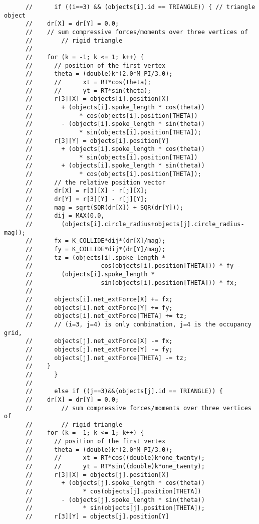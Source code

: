 \documentclass{article}
\begin{document}
\begin{verbatim}
      //      if ((i==3) && (objects[i].id == TRIANGLE)) { // triangle object
      //	dr[X] = dr[Y] = 0.0;
      //	// sum compressive forces/moments over three vertices of
      //        // rigid triangle
      //
      //	for (k = -1; k <= 1; k++) {
      //	  // position of the first vertex
      //	  theta = (double)k*(2.0*M_PI/3.0);
      //	  //	  xt = RT*cos(theta); 
      //	  //	  yt = RT*sin(theta); 
      //	  r[3][X] = objects[i].position[X] 
      //	    + (objects[i].spoke_length * cos(theta))
      //	         * cos(objects[i].position[THETA]) 
      //	    - (objects[i].spoke_length * sin(theta))
      //	         * sin(objects[i].position[THETA]);
      //	  r[3][Y] = objects[i].position[Y] 
      //	    + (objects[i].spoke_length * cos(theta))
      //	         * sin(objects[i].position[THETA]) 
      //	    + (objects[i].spoke_length * sin(theta))
      //	         * cos(objects[i].position[THETA]);
      //	  // the relative position vector
      //	  dr[X] = r[3][X] - r[j][X];
      //	  dr[Y] = r[3][Y] - r[j][Y];
      //	  mag = sqrt(SQR(dr[X]) + SQR(dr[Y]));
      //	  dij = MAX(0.0, 
      //	    (objects[i].circle_radius+objects[j].circle_radius-mag)); 
      //	  fx = K_COLLIDE*dij*(dr[X]/mag);
      //	  fy = K_COLLIDE*dij*(dr[Y]/mag);
      //	  tz = (objects[i].spoke_length *
      //                   cos(objects[i].position[THETA])) * fy -
      // 	    (objects[i].spoke_length *
      //                   sin(objects[i].position[THETA])) * fx;
      //
      //	  objects[i].net_extForce[X] += fx;
      //	  objects[i].net_extForce[Y] += fy;
      //	  objects[i].net_extForce[THETA] += tz;
      //	  // (i=3, j=4) is only combination, j=4 is the occupancy grid,
      //	  objects[j].net_extForce[X] -= fx;
      //	  objects[j].net_extForce[Y] -= fy;
      //	  objects[j].net_extForce[THETA] -= tz;
      //	}	    
      //      }
      //
      //      else if ((j==3)&&(objects[j].id == TRIANGLE)) {
      //	dr[X] = dr[Y] = 0.0;
      //        // sum compressive forces/moments over three vertices of
      //        // rigid triangle     
      //	for (k = -1; k <= 1; k++) {
      //	  // position of the first vertex
      //	  theta = (double)k*(2.0*M_PI/3.0);
      //	  //	  xt = RT*cos((double)k*one_twenty); 
      //	  //	  yt = RT*sin((double)k*one_twenty); 
      //	  r[3][X] = objects[j].position[X] 
      //	    + (objects[j].spoke_length * cos(theta))
      //	          * cos(objects[j].position[THETA]) 
      //	    - (objects[j].spoke_length * sin(theta))
      //	          * sin(objects[j].position[THETA]);
      //	  r[3][Y] = objects[j].position[Y] 

\end{verbatim}
\end{document}
